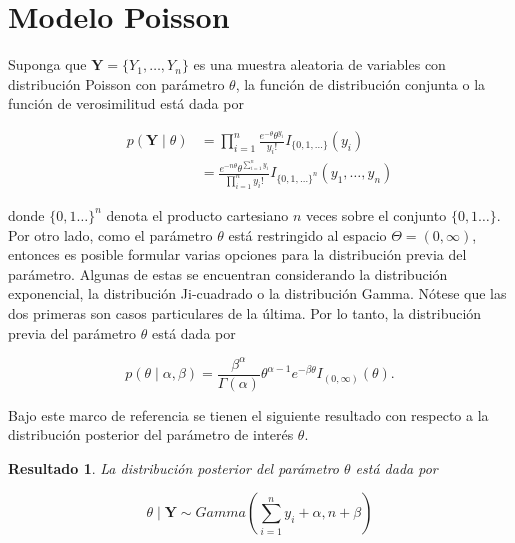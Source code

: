 \documentclass[
  10pt,
  spanish,
]{book}
\newtheorem{proposition}{Resultado}[chapter]
\theoremstyle{definition}
\theoremstyle{definition}
\theoremstyle{definition}
\theoremstyle{definition}
\theoremstyle{remark}
\begin{document}
\hypertarget{modelo-poisson}{%
\section{Modelo Poisson}\label{modelo-poisson}}

Suponga que \(\mathbf{Y}=\{Y_1,\ldots,Y_n\}\) es una muestra aleatoria de variables con distribución Poisson con parámetro \(\theta\), la función de distribución conjunta o la función de verosimilitud está dada por

\begin{align*}
p(\mathbf{Y} \mid \theta)&=\prod_{i=1}^n\frac{e^{-\theta}\theta^{y_i}}{y_i!}I_{\{0,1,\ldots\}}(y_i)\\
&=\frac{e^{-n\theta}\theta^{\sum_{i=1}^ny_i}}{\prod_{i=1}^ny_i!}I_{\{0,1,\ldots\}^n}(y_1,\ldots,y_n)
\end{align*}

donde \(\{0,1\ldots\}^n\) denota el producto cartesiano \(n\) veces sobre el conjunto \(\{0,1\ldots\}\). Por otro lado, como el parámetro \(\theta\) está restringido al espacio \(\Theta=(0,\infty)\), entonces es posible formular varias opciones para la distribución previa del parámetro. Algunas de estas se encuentran considerando la distribución exponencial, la distribución Ji-cuadrado o la distribución Gamma. Nótese que las dos primeras son casos particulares de la última. Por lo tanto, la distribución previa del parámetro \(\theta\) está dada por

\begin{equation}
\label{eq:PreviaGamma}
p(\theta \mid \alpha,\beta)=\frac{\beta^\alpha}{\Gamma(\alpha)}\theta^{\alpha-1} e^{-\beta\theta}I_{(0,\infty)}(\theta).
\end{equation}

Bajo este marco de referencia se tienen el siguiente resultado con respecto a la distribución posterior del parámetro de interés \(\theta\).

\begin{proposition}
\protect\hypertarget{prp:ResPoissonPost}{}{\label{prp:ResPoissonPost} }La distribución posterior del parámetro \(\theta\) está dada por

\begin{equation*}
\theta \mid \mathbf{Y} \sim Gamma\left(\sum_{i=1}^ny_i+\alpha,n+\beta\right)
\end{equation*}
\end{proposition}
\end{document}

